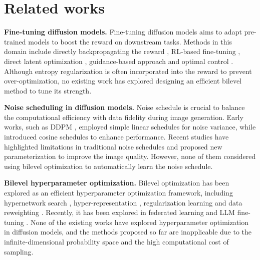 \section{Related works}
\noindent\textbf{Fine-tuning diffusion models. } Fine-tuning diffusion models aims to adapt pre-trained models to boost the reward on downstream tasks. Methods in this domain include directly backpropagating the reward \citep{clarkdirectly}, RL-based fine-tuning \citep{fan2024reinforcement, black2023training}, direct latent optimization \citep{tang2024tuning, wallace2023end}, guidance-based approach \citep{guo2024gradient, chung2022diffusion} and optimal control \citep{uehara2024fine}. Although entropy regularization is often incorporated into the reward to prevent over-optimization, no existing work has explored designing an efficient bilevel method to tune its strength. 

\noindent\textbf{Noise scheduling in diffusion models. } Noise schedule is crucial to balance the computational efficiency with data fidelity during image generation. Early works, such as DDPM \citep{ho2020denoising}, employed simple linear schedules for noise variance, while \citet{nichol2021improved} introduced cosine schedules to enhance performance. Recent studies \citep{lin2024common,chen2023importance} have highlighted limitations in traditional noise schedules and proposed new parameterization to improve the image quality. However, none of them considered using bilevel optimization to automatically learn the noise schedule. 

\noindent\textbf{Bilevel hyperparameter optimization. } Bilevel optimization has been explored as an efficient hyperparameter optimization framework, including hypernetwork search \citep{mackayself,liu2018darts}, hyper-representation \citep{franceschi2018bilevel}, regularization learning \citep{shaban2019truncated} and data reweighting \citep{shaban2019truncated,franceschi2017forward}. Recently, it has been explored in federated learning \citep{tarzanagh2022fednest} and LLM fine-tuning \citep{shen2024seal,zakarias2024bissl}. None of the existing works have explored hyperparameter optimization in diffusion models, and the methods proposed so far are inapplicable due to the infinite-dimensional probability space and the high computational cost of sampling. 


